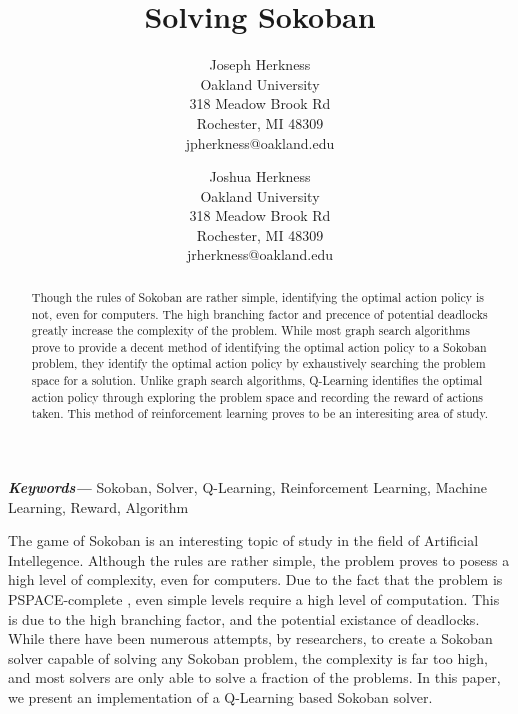 \documentclass[times, 10pt,twocolumn]{article}
\begin{document}
\title{Solving Sokoban}

\author{
Joseph Herkness\\
Oakland University\\
318 Meadow Brook Rd\\
Rochester, MI 48309\\
jpherkness@oakland.edu
\and
Joshua Herkness\\
Oakland University\\
318 Meadow Brook Rd\\
Rochester, MI 48309\\
jrherkness@oakland.edu\\
}

\maketitle
\thispagestyle{empty}

\begin{abstract}
Though the rules of Sokoban are rather simple, identifying the optimal action policy is not, even for computers. The high branching factor and precence of potential deadlocks greatly increase the complexity of the problem. While most graph search algorithms prove to provide a decent method of identifying the optimal action policy to a Sokoban problem, they identify the optimal action policy by exhaustively searching the problem space for a solution. Unlike graph search algorithms, Q-Learning identifies the optimal action policy through exploring the problem space and recording the reward of actions taken. This method of reinforcement learning proves to be an interesiting area of study.
\end{abstract}

\providecommand{\keywords}[1]{\textbf{\textit{Keywords---}} #1}
\keywords{Sokoban, Solver, Q-Learning, Reinforcement Learning, Machine Learning, Reward, Algorithm}


The game of Sokoban is an interesting topic of study in the field of Artificial Intellegence. Although the rules are rather simple, the problem proves to posess a high level of complexity, even for computers. Due to the fact that the problem is PSPACE-complete \cite{Pspace-complete97sokobanis}, even simple levels require a high level of computation. This is due to the high branching factor, and the potential existance of deadlocks. While there have been numerous attempts, by researchers, to create a Sokoban solver capable of solving any Sokoban problem, the complexity is far too high, and most solvers are only able to solve a fraction of the problems. In this paper, we present an implementation of a Q-Learning based Sokoban solver.
\end{document}
